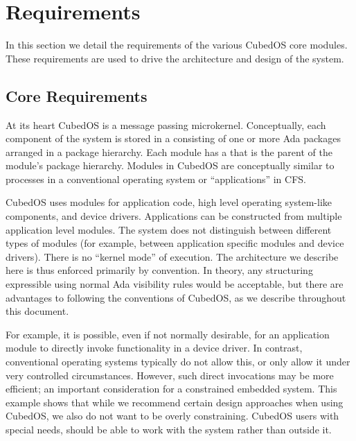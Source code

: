
\section{Requirements}
\label{sec:design-requirements}

In this section we detail the requirements of the various CubedOS core modules. These
requirements are used to drive the architecture and design of the system. 

\subsection{Core Requirements}
\label{sec:requirements-core-requirements}

At its heart CubedOS is a message passing microkernel. Conceptually, each component of the
system is stored in a  consisting of one or more Ada packages arranged in a
package hierarchy. Each module has a  that is the parent of the
module's package hierarchy. Modules in CubedOS are conceptually similar to processes in a
conventional operating system or ``applications'' in CFS.

CubedOS uses modules for application code, high level operating system-like components, and
device drivers. Applications can be constructed from multiple application level modules. The
system does not distinguish between different types of modules (for example, between application
specific modules and device drivers). There is no ``kernel mode'' of execution. The architecture
we describe here is thus enforced primarily by convention. In theory, any structuring
expressible using normal Ada visibility rules would be acceptable, but there are advantages to
following the conventions of CubedOS, as we describe throughout this document. 

For example, it is possible, even if not normally desirable, for an application module to
directly invoke functionality in a device driver. In contrast, conventional operating systems
typically do not allow this, or only allow it under very controlled circumstances. However, such
direct invocations may be more efficient; an important consideration for a constrained embedded
system. This example shows that while we recommend certain design approaches when using CubedOS,
we also do not want to be overly constraining. CubedOS users with special needs, should be able
to work with the system rather than outside it.

